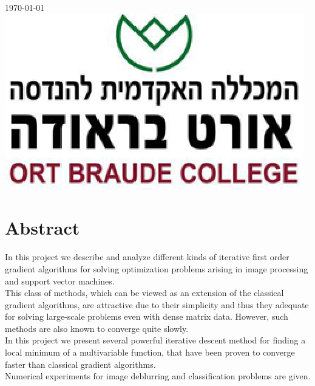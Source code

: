 \documentclass[12pt]{article}
\begin{document}
\begin{titlepage}
{\large \today}\\[2cm] %
\includegraphics[scale=0.3]{Braude_Logo2.png}\\[1cm] %

\vfill %

\end{titlepage}

\newpage
{
\hypersetup{linkcolor=black}
\tableofcontents
}

\newpage
\section{Abstract}
In this project we describe and analyze different kinds of iterative first order gradient algorithms for solving optimization problems arising in image processing and support vector machines.\\
This class of methods, which can be viewed as an extension of the classical gradient algorithms, are attractive due to their simplicity and thus they adequate for solving large-scale problems even with dense matrix data. 
However, such methods are also known to converge quite slowly.\\ 
In this project we present several powerful iterative descent method for finding a local minimum of a multivariable function, that have been proven to converge faster than classical gradient algorithms. \\
Numerical experiments for image deblurring and classification problems are given. 

\newpage
\end{document}
